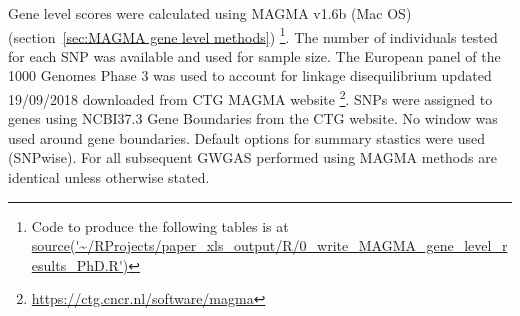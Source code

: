 Gene level scores were calculated using MAGMA v1.6b (Mac OS)(section~\ref{sec:MAGMA gene level methods}) \footnote{Code to produce the following tables is at \url{source('~/RProjects/paper_xls_output/R/0_write_MAGMA_gene_level_results_PhD.R')} }. The number of individuals tested for each SNP was available and used for sample size. The European panel of the 1000 Genomes Phase 3 was used to account for linkage disequilibrium
 updated 19/09/2018 downloaded from CTG MAGMA website \footnote{\url{https://ctg.cncr.nl/software/magma}}. SNPs were assigned to genes using NCBI37.3 Gene Boundaries from the CTG website.  No window was used around gene boundaries. Default options for summary stastics were used (SNPwise). For all subsequent GWGAS performed using MAGMA methods are identical unless otherwise stated. 





